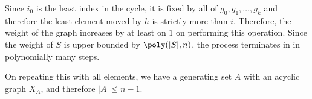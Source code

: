
Since $i_0$ is the least index in the cycle, it is fixed by all of 
$g_0, g_1,\ldots,  g_k$ and therefore the least element moved by $h$ is
strictly more than $i$. Therefore, the weight of the graph increases by at
least on $1$ on performing this operation. 
Since the weight of $S$ is upper bounded by $\poly(|S|,n)$, the process 
terminates in in polynomially many steps. 
	
On repeating this with all elements, we have a generating set $A$ with an
acyclic graph $X_{A}$, and therefore $|A|\leq n-1$.

